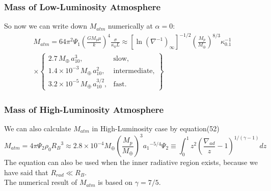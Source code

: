 \documentclass{beamer}
\begin{document}
\begin{frame}
\frametitle{Mass of Low-Luminosity Atmosphere}
So now we can write down $M_{atm}$ numerically at $\alpha=0$:
\begin{align}
\tag{57}
M_{atm} = 64 \pi^2 \Psi_1 \left( \frac{GM_p \mu}{k} \right)^4 \frac{\sigma}{\kappa_0 L} \approx \left[ \ln \left( \nabla^{-1} \right)_{\infty} \right]^{-1/2} \left( \frac{M_p}{M_{\oplus}} \right)^{8/3} \kappa_{0.1}^{-1} \\
\times \left\{ 
\tag{57}
\begin{array}{ll} 
2.7 \, M_{\oplus} \, a_{10}^3, & \text{slow,} \\ 
1.4 \times 10^{-3} \, M_{\oplus} \, a_{10}^2, & \text{intermediate,} \\ 
3.2 \times 10^{-5} \, M_{\oplus} \, a_{10}^{3/2}, & \text{fast.} 
\end{array}  
\right\}
\end{align}
\end{frame}

\begin{frame}
\frametitle{Mass of High-Luminosity Atmosphere}
We can also calculate $M_{atm}$ in High-Luminosity case by equation(52)
\begin{equation}
\tag{58}
M_{atm} = 4 \pi \Psi_2 \rho_0 {R_B}^3 \approx 2.8 \times {10}^{-4} M_{\oplus} {(\frac{M_p}{M_{\oplus}})}^3 {a_1}^{-5/4}
\Psi_2 \equiv \int_{0}^{1} z^2{(\frac{\nabla_{ad}}{z}-1)}^{1/(\gamma-1)} dz
\end{equation}
The equation can also be used when the inner radiative region exists, because we have said that $R_{rad} \ll R_B$.\\
The numerical result of $M_{atm}$ is based on $\gamma= 7/5$.
\end{frame}
\end{document}
